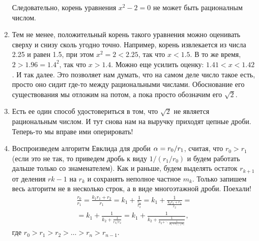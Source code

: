 \begin{enumerate}
Следовательно, корень уравнения $x^2-2=0$ не может быть рационалным числом.
\item Тем не менее, положительный корень такого уравнения можно оценивать сверху и снизу сколь угодно точно. Например, корень извлекается из числа 2.25 и равен 1.5, при этом $x^2=2<2.25$, так что $x<1.5$. В то же время, $2>1.96=1.4^2$, так что $x>1.4$. Можно еще усилить оценку: $1.41<x<1.42$. И так далее. Это позволяет нам думать, что на самом деле число такое есть, просто оно сидит где-то между рациональными числами. Обоснование его существования мы отложим на потом, а пока просто обозначим его $\sqrt 2$.
\item Есть ее один способ удостовериться в том, что $\sqrt 2$ не является рациональным числом. И тут снова нам на выручку приходят цепные дроби. Теперь-то мы вправе ими оперировать!
\item Воспроизведем алгоритм Евклида для дроби $\alpha = r_0/r_1$, считая, что $r_0>r_1$ (если это не так, то приведем дробь к виду $1/(r_1/r_0)$ и будем работать дальше только со знаменателем). Как и раньше, будем выделять остаток $r_{k+1}$ от деления $r{k-1}$ на $r_k$ и сохранять неполное частное $m_k$. Только запишем весь алгоритм не в несколько строк, а в виде многоэтажной дроби. Поехали!
\begin{multline*}
\frac{r_0}{r_1} = \frac{k_1r_1+r_2}{r_1} = \boxed{k_1}+\frac{1}{\frac{r_1}{r_2}} =
\boxed{k_1} + \frac{1}{\frac{k_2r_2+r_3}{r_2}} =  \\
= \boxed{k_1} + \frac{1}{\boxed{k_2} + \frac{1}{r_3/r_2}} = 
\boxed{k_1} + \frac{1}{\boxed{k_2} + \frac{1}{\boxed{k_3} + \ddots \frac{1}{\boxed{k_n}+r_{n+1}/r_n}}},
\end{multline*}
где $r_0>r_1>r_2>\dots>r_n>r_{n-1}$.


\end{enumerate}
